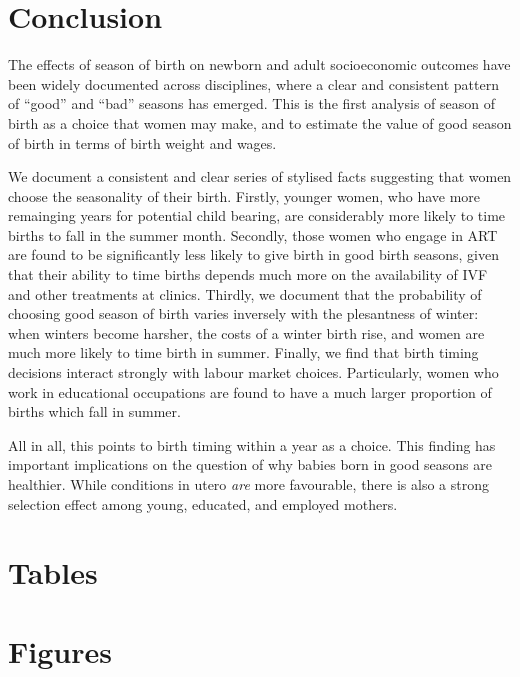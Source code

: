 \documentclass[a4paper, 12 pt]{article}
\theoremstyle{plain}
\begin{document}
\begin{doublespace}
\section{Conclusion}
The effects of season of birth on newborn and adult socioeconomic outcomes have been widely documented across disciplines, where a clear and consistent pattern of ``good'' and ``bad'' seasons has emerged. This is the first analysis of season of birth as a choice that women may make, and to estimate the value of good season of birth in terms of birth weight and wages.

We document a consistent and clear series of stylised facts suggesting that women choose the seasonality of their birth.  Firstly, younger women, who have more remainging years for potential child bearing, are considerably more likely to time births to fall in the summer month.  Secondly, those women who engage in ART are found to be significantly less likely to give birth in good birth seasons, given that their ability to time births depends much more on the availability of IVF and other treatments at clinics.  Thirdly, we document that the probability of choosing good season of birth varies inversely with the plesantness of winter: when winters become harsher, the costs of a winter birth rise, and women are much more likely to time birth in summer. Finally, we find that birth timing decisions interact strongly with labour market choices.  Particularly, women who work in educational occupations are found to have a much larger proportion of births which fall in summer.

All in all, this points to birth timing within a year as a choice.  This finding has important implications on the question of why babies born in good seasons are healthier.  While conditions in utero \emph{are} more favourable, there is also a strong selection effect among young, educated, and employed mothers.

\newpage
%
%
%





\newpage
\section*{Tables}



\newpage
\section*{Figures}




\end{doublespace}
\end{document}
